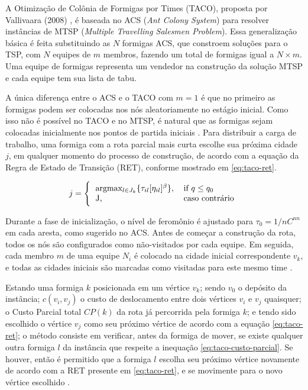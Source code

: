 A Otimização de Colônia de Formigas por Times (TACO), proposta por Vallivaara (2008) \cite{vallivaara2008team}, é baseada no ACS (\textit{Ant Colony System}) para resolver instâncias de MTSP (\textit{Multiple Travelling Salesmen Problem}). Essa generalização básica é feita substituindo as $N$ formigas ACS, que constroem soluções para o TSP, com $N$ equipes de $m$ membros, fazendo um total de formigas igual a $N \times m$. Uma equipe de formigas representa um vendedor na construção da solução MTSP e cada equipe tem sua lista de tabu.

A única diferença entre o ACS e o TACO com $m = 1$ é que no primeiro as formigas podem ser colocadas nos nós aleatoriamente no estágio inicial. Como isso não é possível no TACO e no MTSP, é natural que as formigas sejam colocadas inicialmente nos pontos de partida iniciais \cite{vallivaara2008team}. Para distribuir a carga de trabalho, uma formiga com a rota parcial mais curta escolhe sua próxima cidade $j$, em qualquer momento do processo de construção, de acordo com a equação da Regra de Estado de Transição (RET), conforme mostrado em \ref{eq:taco-ret}.

\begin{equation} \label{eq:taco-ret} 
    j = \Bigg\{
        \begin{tabular}{ll}
        argmax\(_{l \in J_k} \{\tau_{il}[\eta_{il}]^\beta\}\), & if $q \leq q_0$ \\
        J, & caso contrário
        \end{tabular}
\end{equation}

Durante a fase de inicialização, o nível de feromônio é ajustado para $\tau_0 = 1 / nC^{nn}$ em cada aresta, como sugerido no ACS. Antes de começar a construção da rota, todos os nós são configurados como não-visitados por cada equipe. Em seguida, cada membro $m$ de uma equipe $N_i$ é colocado na cidade inicial correspondente $v_k$, e todas as cidades iniciais são marcadas como visitadas para este mesmo time \cite{vallivaara2008team}.

Estando uma formiga $k$ posicionada em um vértice $v_k$; sendo $v_0$ o depósito da instância; $c(v_i, v_j)$ o
custo de deslocamento entre dois vértices $v_i$ e $v_j$ quaisquer; o Custo Parcial total $CP(k)$ da rota já percorrida pela formiga $k$; e tendo sido escolhido o vértice $v_j$ como seu próximo vértice de acordo com a equação \ref{eq:taco-ret}; o método consiste em verificar, antes da formiga de mover, se existe qualquer outra formiga $l$ da instância que respeite a inequação \ref{eq:taco-custo-parcial}. Se houver, então é permitido que a formiga $l$ escolha seu próximo vértice novamente de acordo com a RET presente em \ref{eq:taco-ret}, e se movimente para o novo vértice escolhido \cite{vallivaara2008team}.

